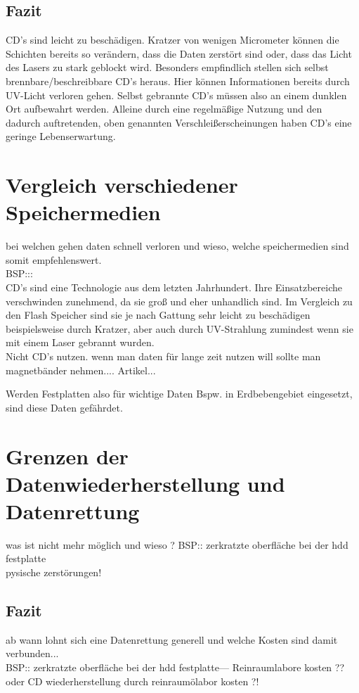 \documentclass[10pt,a4paper]{article} %
\begin{document}
\subsection{Fazit}
CD's sind leicht zu beschädigen. Kratzer von wenigen Micrometer können die Schichten bereits so verändern, dass die Daten zerstört sind oder, dass das Licht des Lasers zu stark geblockt wird. Besonders empfindlich stellen sich selbst brennbare/beschreibbare CD's heraus. Hier können Informationen bereits durch UV-Licht verloren gehen. Selbst gebrannte CD's müssen also an einem dunklen Ort aufbewahrt werden. Alleine durch eine regelmäßige Nutzung und den dadurch auftretenden, oben genannten Verschleißerscheinungen haben CD's eine geringe Lebenserwartung.













\newpage



\section{Vergleich verschiedener Speichermedien} %
bei welchen gehen daten schnell verloren und wieso,
welche speichermedien sind somit empfehlenswert.\\
BSP:::\\

CD's sind eine Technologie aus dem letzten Jahrhundert. Ihre Einsatzbereiche verschwinden zunehmend, da sie groß und eher unhandlich sind. Im Vergleich zu den Flash Speicher sind sie je nach Gattung sehr leicht zu beschädigen beispielsweise durch Kratzer, aber auch durch UV-Strahlung zumindest wenn sie mit einem Laser gebrannt wurden.\\
Nicht CD's nutzen. wenn man daten für lange zeit nutzen will sollte man magnetbänder nehmen.... Artikel...

 Werden Festplatten also für wichtige Daten Bspw. in Erdbebengebiet eingesetzt, sind diese Daten gefährdet.




\newpage
\section{Grenzen der Datenwiederherstellung und Datenrettung} %
was ist nicht mehr möglich und wieso ?
BSP:: zerkratzte oberfläche bei der hdd festplatte \\
pysische zerstörungen!
\subsection{Fazit}
ab wann lohnt sich eine Datenrettung generell und welche Kosten sind damit verbunden...\\
BSP:: zerkratzte oberfläche bei der hdd festplatte--- Reinraumlabore kosten ?? \\
oder CD wiederherstellung durch reinraumölabor kosten ?!\\

\newpage

\end{document}
